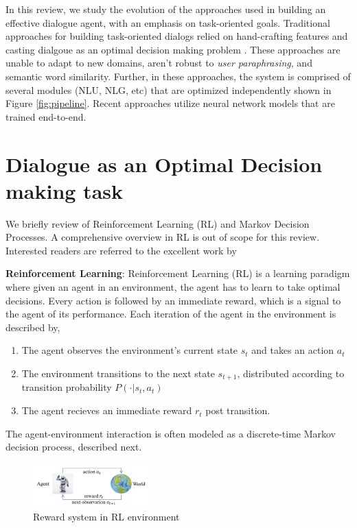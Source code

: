 \documentclass[11pt,a4paper]{article}
\begin{document}
In this review, we study the evolution of the approaches used in building an effective dialogue agent, with an emphasis on task-oriented goals. Traditional approaches for building task-oriented dialogs relied on hand-crafting features \cite{Core1997CodingDW, Jelinek1976SpeechRB} and casting dialgoue as an optimal decision making problem \cite{Young2013POMDPBasedSS, Kaelbling1998PlanningAA}. These approaches are unable to adapt to new domains, aren't robust to \textit{user paraphrasing}, and semantic word similarity. Further, in these approaches, the system is comprised of several modules (NLU, NLG, etc) that are optimized independently shown in Figure \ref{fig:pipeline}. Recent approaches utilize neural network models that are trained end-to-end.

\section{Dialogue as an Optimal Decision making task}

We briefly review of Reinforcement Learning (RL) and Markov Decision Processes. A comprehensive overview in RL is out of scope for this review. Interested readers are referred to the excellent work by \cite{Sutton1988ReinforcementLA, Kaelbling1996ReinforcementLA}

\medskip \noindent \textbf{Reinforcement Learning}: Reinforcement Learning (RL) is a learning paradigm where given an agent in an environment, the agent has to learn to take optimal decisions. Every action is followed by an immediate reward, which is a signal to the agent of its performance. Each iteration of the agent in the environment is described by,
\begin{enumerate}[leftmargin=*]
  \item The agent observes the environment's current state $s_t$ and takes an action $a_t$
  \item The environment transitions to the next state $s_{t+1}$, distributed according to transition probability $P(\cdot | s_t, a_t)$
  \item The agent recieves an immediate reward $r_t$ post transition.
\end{enumerate}
The agent-environment interaction is often modeled as a discrete-time Markov decision process, described next.

\begin{figure}[H]
  \centering
  \includegraphics[width=0.4\textwidth]{images/rl.png}
  \caption{Reward system in RL environment}
  \label{fig:rl}
\end{figure}
\end{document}

